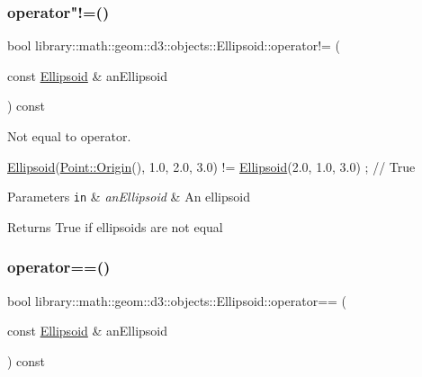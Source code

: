 \subsubsection{\texorpdfstring{operator"!=()}{operator!=()}}
{\footnotesize\ttfamily bool library\+::math\+::geom\+::d3\+::objects\+::\+Ellipsoid\+::operator!= (\begin{DoxyParamCaption}\item[{const \hyperlink{classlibrary_1_1math_1_1geom_1_1d3_1_1objects_1_1_ellipsoid}{Ellipsoid} \&}]{an\+Ellipsoid }\end{DoxyParamCaption}) const}



Not equal to operator. 


\begin{DoxyCode}
\hyperlink{classlibrary_1_1math_1_1geom_1_1d3_1_1objects_1_1_ellipsoid_aae81fe0edc7f0e8d4590ea89ae73cb14}{Ellipsoid}(\hyperlink{classlibrary_1_1math_1_1geom_1_1d3_1_1objects_1_1_point_ab2a38e285c562e50bf350272c083986f}{Point::Origin}(), 1.0, 2.0, 3.0) != \hyperlink{classlibrary_1_1math_1_1geom_1_1d3_1_1objects_1_1_ellipsoid_aae81fe0edc7f0e8d4590ea89ae73cb14}{Ellipsoid}(2.0, 1.0, 3.0) ; \textcolor{comment}{//
       True}
\end{DoxyCode}



\begin{DoxyParams}[1]{Parameters}
\mbox{\tt in}  & {\em an\+Ellipsoid} & An ellipsoid \\
\hline
\end{DoxyParams}
\begin{DoxyReturn}{Returns}
True if ellipsoids are not equal 
\end{DoxyReturn}
\mbox{\label{classlibrary_1_1math_1_1geom_1_1d3_1_1objects_1_1_ellipsoid_a259ca94e493d1e8694292aaa579ae1e7}} 
\subsubsection{\texorpdfstring{operator==()}{operator==()}}
{\footnotesize\ttfamily bool library\+::math\+::geom\+::d3\+::objects\+::\+Ellipsoid\+::operator== (\begin{DoxyParamCaption}\item[{const \hyperlink{classlibrary_1_1math_1_1geom_1_1d3_1_1objects_1_1_ellipsoid}{Ellipsoid} \&}]{an\+Ellipsoid }\end{DoxyParamCaption}) const}



